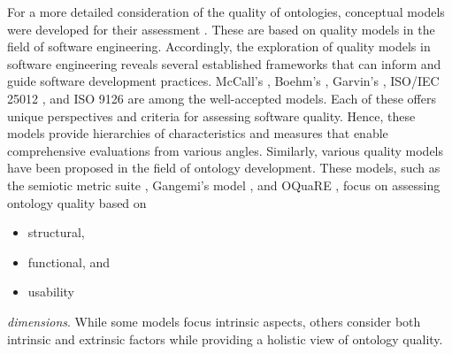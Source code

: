 For a more detailed consideration of the quality of ontologies, conceptual models were developed for their assessment \cite{WilsonQuality2021, WilsonQuality2023}. These are based on quality models in the field of software engineering. 
Accordingly, the exploration of quality models in software engineering reveals several established frameworks that can inform and guide software development practices. McCall’s \cite{McCallModel1978}, Boehm’s \cite{BoehmQuality1976}, Garvin’s \cite{GarvinQuality1984}, ISO/IEC 25012 \cite{ISO25012}, and ISO 9126 \cite{ISO9126-2, ISO9126-3, ISO9126-4} are among the well-accepted models. Each of these offers unique perspectives and criteria for assessing software quality. Hence, these models provide hierarchies of characteristics and measures that enable comprehensive evaluations from various angles.
Similarly, various quality models have been proposed in the field of ontology development. These models, such as the semiotic metric suite \cite{BurtonQuality2005}, Gangemi's model \cite{GangemiOntoEval2006}, and OQuaRE \cite{DuqueOQuaRE2011}, focus on assessing ontology quality based on 
\begin{itemize}
    \item structural, 
    \item functional, and 
    \item usability
\end{itemize} \textit{dimensions}. While some models focus intrinsic aspects, others consider both intrinsic and extrinsic factors while providing a holistic view of ontology quality.

